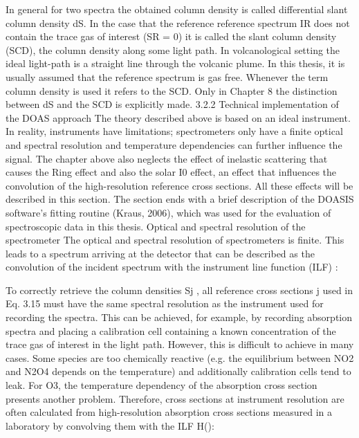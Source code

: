 \documentclass  [
  paper    = a4,
  BCOR     = 10mm,
  twoside,
  fontsize = 12pt,
  fleqn,
  toc      = bibnumbered,
  toc      = listofnumbered,
  numbers  = noendperiod,
  headings = normal,
  listof   = leveldown,
  version  = 3.03
]                                       {scrreprt}
\begin{document}
	In general for two spectra the obtained column density is called differential
	slant column density dS. In the case that the reference reference spectrum IR
	does not contain the trace gas of interest (SR = 0) it is called the slant column
	density (SCD), the column density along some light path. In volcanological setting the ideal light-path is a straight line through the volcanic plume. In this
	thesis, it is usually assumed that the reference spectrum is gas free. Whenever
	the term column density is used it refers to the SCD. Only in Chapter 8 the
	distinction between dS and the SCD is explicitly made.
	3.2.2 Technical implementation of the DOAS approach
	The theory described above is based on an ideal instrument. In reality, instruments
	have limitations; spectrometers only have a finite optical and spectral
	resolution and temperature dependencies can further influence the signal. The
	chapter above also neglects the effect of inelastic scattering that causes the Ring
	effect and also the solar I0 effect, an effect that influences the convolution of the
	high-resolution reference cross sections. All these effects will be described in
	this section. The section ends with a brief description of the DOASIS software’s
	fitting routine (Kraus, 2006), which was used for the evaluation of spectroscopic
	data in this thesis.
	Optical and spectral resolution of the spectrometer
	The optical and spectral resolution of spectrometers is finite. This leads to a
	spectrum arriving at the detector that can be described as the convolution
	of the incident spectrum  with the instrument line function (ILF) :

	To correctly retrieve the column densities Sj , all reference cross sections j
	used in Eq. 3.15 must have the same spectral resolution as the instrument used for
	recording the spectra. This can be achieved, for example, by recording absorption
	spectra and placing a calibration cell containing a known concentration of the
	trace gas of interest in the light path. However, this is difficult to achieve in many
	cases. Some species are too chemically reactive (e.g. the equilibrium between
	NO2 and N2O4 depends on the temperature) and additionally calibration cells
	tend to leak. For O3, the temperature dependency of the absorption cross
	section presents another problem. Therefore, cross sections 
 at instrument
	resolution are often calculated from high-resolution absorption cross sections
 measured in a laboratory by convolving them with the ILF H():
\end{document}
